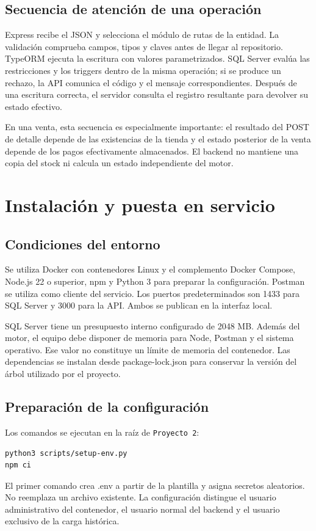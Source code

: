 \subsection{Secuencia de atención de una operación}
Express recibe el JSON y selecciona el módulo de rutas de la entidad. La validación comprueba campos, tipos y claves antes de llegar al repositorio. TypeORM ejecuta la escritura con valores parametrizados. SQL Server evalúa las restricciones y los triggers dentro de la misma operación; si se produce un rechazo, la API comunica el código y el mensaje correspondientes. Después de una escritura correcta, el servidor consulta el registro resultante para devolver su estado efectivo.

En una venta, esta secuencia es especialmente importante: el resultado del POST de detalle depende de las existencias de la tienda y el estado posterior de la venta depende de los pagos efectivamente almacenados. El backend no mantiene una copia del stock ni calcula un estado independiente del motor.

\section{Instalación y puesta en servicio}
\subsection{Condiciones del entorno}
Se utiliza Docker con contenedores Linux y el complemento Docker Compose, Node.js 22 o superior, npm y Python 3 para preparar la configuración. Postman se utiliza como cliente del servicio. Los puertos predeterminados son 1433 para SQL Server y 3000 para la API. Ambos se publican en la interfaz local.

SQL Server tiene un presupuesto interno configurado de 2048 MB. Además del motor, el equipo debe disponer de memoria para Node, Postman y el sistema operativo. Ese valor no constituye un límite de memoria del contenedor. Las dependencias se instalan desde package-lock.json para conservar la versión del árbol utilizado por el proyecto.

\subsection{Preparación de la configuración}
Los comandos se ejecutan en la raíz de \texttt{Proyecto 2}:
\begin{lstlisting}
python3 scripts/setup-env.py
npm ci
\end{lstlisting}
El primer comando crea .env a partir de la plantilla y asigna secretos aleatorios. No reemplaza un archivo existente. La configuración distingue el usuario administrativo del contenedor, el usuario normal del backend y el usuario exclusivo de la carga histórica.

